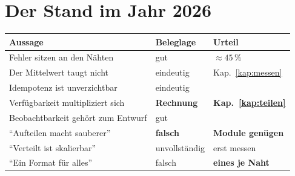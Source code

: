 \chapter{Der Stand im Jahr 2026}\label{kap:aktuell}

\begin{merksatz}
\begin{center}
{\small
\renewcommand{\arraystretch}{1.5}
\begin{tabular}{@{}P{3.6cm}P{2.0cm}P{2.4cm}@{}}
\toprule
\textbf{Aussage} & \textbf{Beleglage} & \textbf{Urteil}\\
\midrule
Fehler sitzen an den Nähten & \textcolor{gruen}{gut} & \textcolor{gruen}{$\approx45\,\%$}\\
Der Mittelwert taugt nicht & \textcolor{gruen}{eindeutig} & \textcolor{gruen}{Kap.~\ref{kap:messen}}\\
Idempotenz ist unverzichtbar & \textcolor{gruen}{eindeutig} & \\
Verfügbarkeit multipliziert sich & \textcolor{gruen}{\textbf{Rechnung}} & \textcolor{gruen}{\textbf{Kap.~\ref{kap:teilen}}}\\
Beobachtbarkeit gehört zum Entwurf & \textcolor{gruen}{gut} & \\
\midrule
\enquote{Aufteilen macht sauberer} & \textcolor{akzent}{\textbf{falsch}} & \textcolor{akzent}{\textbf{Module genügen}}\\
\enquote{Verteilt ist skalierbar} & \textcolor{akzent}{unvoll\-ständig} & \textcolor{akzent}{erst messen}\\
\enquote{Ein Format für alles} & \textcolor{akzent}{falsch} & \textbf{eines je Naht}\\
\bottomrule
\end{tabular}}
\end{center}

\begin{center}
\begin{minipage}{0.88\textwidth}
\end{minipage}
\end{center}
\end{merksatz}

